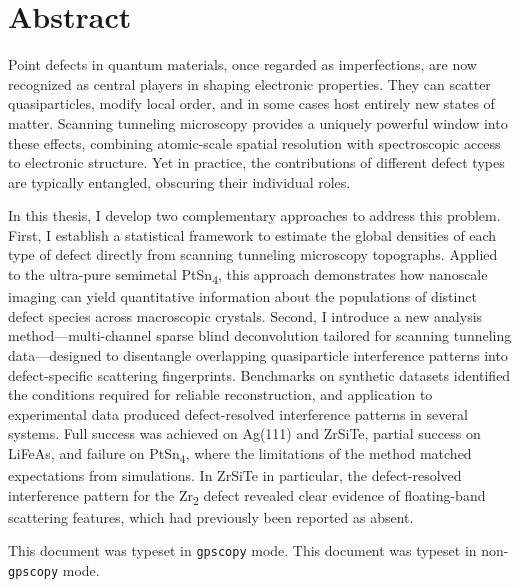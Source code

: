 
\chapter{Abstract}

Point defects in quantum materials, once regarded as imperfections, are now recognized as central players in shaping electronic properties. They can scatter quasiparticles, modify local order, and in some cases host entirely new states of matter. Scanning tunneling microscopy provides a uniquely powerful window into these effects, combining atomic-scale spatial resolution with spectroscopic access to electronic structure. Yet in practice, the contributions of different defect types are typically entangled, obscuring their individual roles.

In this thesis, I develop two complementary approaches to address this problem. First, I establish a statistical framework to estimate the global densities of each type of defect directly from scanning tunneling microscopy topographs. Applied to the ultra-pure semimetal PtSn\textsubscript{4}, this approach demonstrates how nanoscale imaging can yield quantitative information about the populations of distinct defect species across macroscopic crystals. Second, I introduce a new analysis method—multi-channel sparse blind deconvolution tailored for scanning tunneling data—designed to disentangle overlapping quasiparticle interference patterns into defect-specific scattering fingerprints. Benchmarks on synthetic datasets identified the conditions required for reliable reconstruction, and application to experimental data produced defect-resolved interference patterns in several systems. Full success was achieved on Ag(111) and ZrSiTe, partial success on LiFeAs, and failure on PtSn\textsubscript{4}, where the limitations of the method matched expectations from simulations. In ZrSiTe in particular, the defect-resolved interference pattern for the Zr\textsubscript{2} defect revealed clear evidence of floating-band scattering features, which had previously been reported as absent.

\ifgpscopy
  This document was typeset in \texttt{gpscopy} mode.
\else
  This document was typeset in non-\texttt{gpscopy} mode.
\fi


